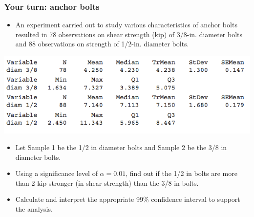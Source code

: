 \documentclass[handout]{beamer}\usepackage{graphicx, color}
\numberwithin{equation}{section}
\begin{document}
\begin{frame}
\frametitle{Your turn: anchor bolts} \scriptsize
\begin{itemize}
\item An experiment carried out to study various characteristics of anchor bolts resulted in 78 observations on shear strength (kip) of 3/8-in. diameter bolts and 88 observations on strength of 1/2-in. diameter bolts.
\end{itemize}
\begin{center}
 \includegraphics{../../fig/anchorboltsminitab.png}
\end{center}
\begin{itemize}
\pause \item Let Sample 1 be the 1/2 in diameter bolts and Sample 2 be the 3/8 in diameter bolts.
\pause \item Using a significance level of $\alpha = 0.01$, find out if the 1/2 in bolts are more than 2 kip stronger (in shear strength) than the 3/8 in bolts. 
\pause \item Calculate and interpret the appropriate 99\% confidence interval to support the analysis.
\end{itemize}
\end{frame}
\end{document}
